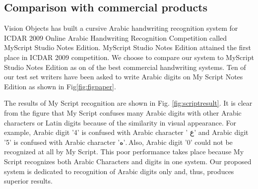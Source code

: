 \documentclass[10pt]{IEEEtran}
\begin{document}
\subsection{Comparison with commercial products}







Vision Objects has built a cursive Arabic handwriting recognition system for ICDAR 2009 Online Arabic Handwriting Recognition Competition \cite{ICDAR2009} called MyScript Studio Notes Edition\cite{MyScript}. MyScript Studio Notes Edition attained the first place in ICDAR 2009 competition. We choose to compare our system to MyScript Studio Notes Edition as on of the best  commercial handwriting systems. Ten of our test set writers have been asked to write Arabic digits on My Script Notes Edition as shown in  Fig\ref{fig:figpaper}.


  The results of My Script recognition are shown in Fig.  \ref{fig:scriptresult}. It is clear from the figure that My Script confuses many Arabic digits with other Arabic characters or Latin digits because of the similarity in visual appearance. For example, Arabic digit '4' is confused with Arabic character ' ع' and Arabic digit '5' is confused with Arabic character 'ه'. Also, Arabic digit '0' could not be recognized at all by My Script. This poor performance takes place because My Script recognizes both Arabic Characters and digits in one system. Our proposed system is dedicated to recognition of Arabic digits only and, thus, produces superior results.
\end{document}
